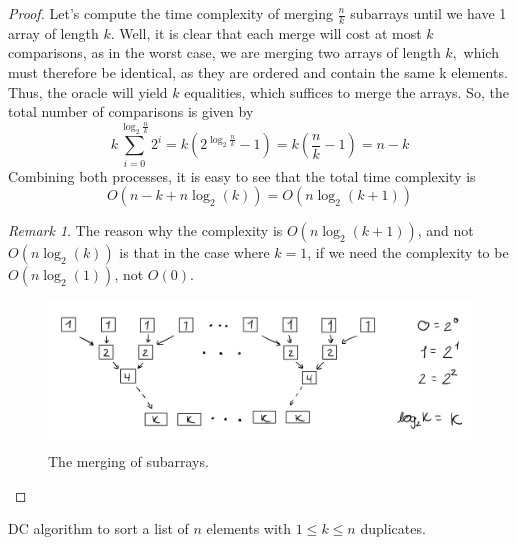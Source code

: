 \documentclass[12pt]{article}
\theoremstyle{definition}
\theoremstyle{remark}
\newtheorem*{remark}{Remark}
\begin{document}
\begin{enumerate}
\begin{enumerate}
\begin{proof}
    
     \hspace{24pt} Let's compute the time complexity of merging $\frac{n}{k}$ subarrays until we have 1 array of length $k.$ Well, it is clear that each merge will cost at most $k$ comparisons, as in the worst case, we are merging two arrays of length $k,$ which must therefore be identical, as they are ordered and contain the same k elements. Thus, the oracle will yield $k$ equalities, which suffices to merge the arrays. So, the total number of comparisons is given by 
     $$k \sum^{\log_2 \frac{n}{k}}_{i=0}  2^i = k (2^{\log_2 \frac{n}{k} }-1) = k \left( \frac{n}{k} -1 \right) = n-k  $$
     Combining both processes, it is easy to see that the total time complexity is 
     $$O(n-k + n \log_2 (k) ) = O(n \log_2 (k + 1)) $$
\begin{remark} 
  The reason why the complexity is $O(n\log_2(k+1))$, and not $O(n\log_2(k))$ is that in the case where $k = 1$, if we need the complexity to be $O(n \log_2 (1))$, not $O(0)$. 
\end{remark}
\begin{figure}
    \centering
    \includegraphics[scale=0.20]{IMG_1052.jpg}
    \caption{The merging of subarrays.}
    \label{fig1}
\end{figure}
   \end{proof}

  \begin{algorithm}
    \caption{DC algorithm to sort a list of $n$ elements with $1\leq k\leq n$ duplicates. }
    \BlankLine
    \BlankLine


\end{algorithm}
\end{enumerate}
\end{enumerate}
\end{document}
